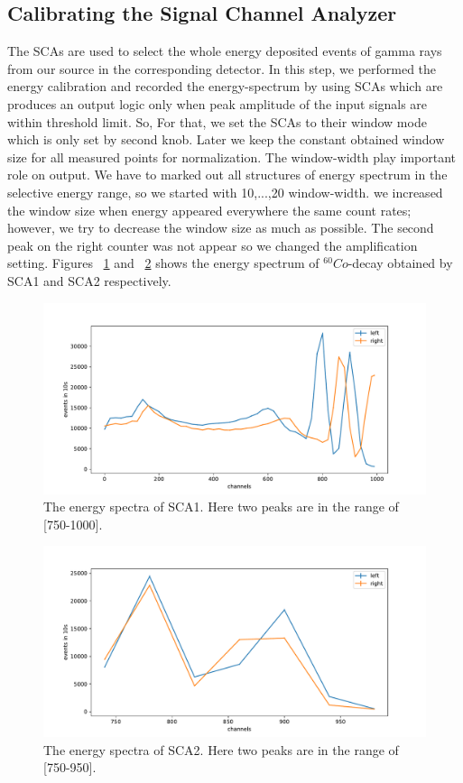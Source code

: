 \subsection{Calibrating the Signal Channel Analyzer}
The SCAs are used to select the whole energy deposited events of gamma rays from our source in the corresponding detector. 
In this step, we performed the energy calibration and recorded the energy-spectrum by using SCAs which are produces an output logic only when peak amplitude of the input signals are within threshold limit. So, For that, we set the SCAs to their window mode which is only set by second knob. Later we keep the constant obtained window size for all measured points for normalization. The window-width play important role on output. We have to  marked out all structures of energy spectrum in the selective energy range, so we started with 10,...,20 window-width. we increased the window size when energy appeared everywhere the same count rates; however, we try to decrease the window size as much as possible. The second peak on the right counter was not appear so we changed the amplification setting. Figures ~\ref{fig:sca1} and ~\ref{fig:sca2} shows the energy spectrum of $ ^{60}Co$-decay obtained by SCA1 and SCA2 respectively.


\begin{figure}[ht]
	\centering
	\includegraphics[width=0.8\linewidth]{./figs/sca.pdf}
	\caption{The energy spectra of SCA1. Here two peaks are in the range of [750-1000].}%
	\label{fig:sca1}
\end{figure}

\begin{figure}[ht]
	\centering
	\includegraphics[width=0.8\linewidth]{./figs/sca2.pdf}
	\caption{The energy spectra of SCA2. Here two peaks are in the range of [750-950].}%
	\label{fig:sca2}
\end{figure}

